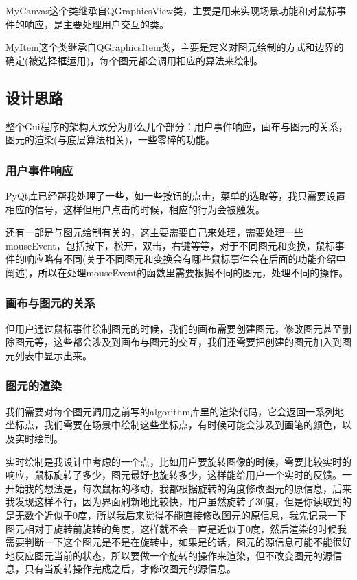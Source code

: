 \documentclass[a4paper,UTF8]{article}
\theoremstyle{definition}
\begin{document}
MyCanvas这个类继承自QGraphicsView类，主要是用来实现场景功能和对鼠标事件的响应，是主要处理用户交互的类。

MyItem这个类继承自QGraphicsItem类，主要是定义对图元绘制的方式和边界的确定(被选择框运用)，每个图元都会调用相应的算法来绘制。


\subsection{设计思路}

整个Gui程序的架构大致分为那么几个部分：用户事件响应，画布与图元的关系，图元的渲染(与底层算法相关)，一些零碎的功能。

\subsubsection{用户事件响应}

PyQt库已经帮我处理了一些，如一些按钮的点击，菜单的选取等，我只需要设置相应的信号，这样但用户点击的时候，相应的行为会被触发。

还有一部是与图元绘制有关的，这主要需要自己来处理，需要处理一些mouseEvent，包括按下，松开，双击，右键等等，对于不同图元和变换，鼠标事件的响应略有不同(关于不同图元和变换会有哪些鼠标事件会在后面的功能介绍中阐述)，所以在处理mouseEvent的函数里需要根据不同的图元，处理不同的操作。

\subsubsection{画布与图元的关系}

但用户通过鼠标事件绘制图元的时候，我们的画布需要创建图元，修改图元甚至删除图元等，这些都会涉及到画布与图元的交互，我们还需要把创建的图元加入到图元列表中显示出来。


\subsubsection{图元的渲染}

我们需要对每个图元调用之前写的algorithm库里的渲染代码，它会返回一系列地坐标点，我们需要在场景中绘制这些坐标点，有时候可能会涉及到画笔的颜色，以及实时绘制。

实时绘制是我设计中考虑的一个点，比如用户要旋转图像的时候，需要比较实时的响应，鼠标旋转了多少，图元最好也旋转多少，这样能给用户一个实时的反馈。一开始我的想法是，每次鼠标的移动，我都根据旋转的角度修改图元的原信息，后来我发现这样不行，因为界面刷新地比较快，用户虽然旋转了30度，但是你读取到的是无数个近似于0度，所以我后来觉得不能直接修改图元的原信息，我先记录一下图元相对于旋转前旋转的角度，这样就不会一直是近似于0度，然后渲染的时候我需要判断一下这个图元是不是在旋转中，如果是的话，图元的源信息可能不能很好地反应图元当前的状态，所以要做一个旋转的操作来渲染，但不改变图元的源信息，只有当旋转操作完成之后，才修改图元的源信息。
\end{document}
